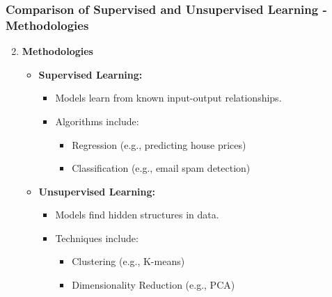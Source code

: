 \documentclass[aspectratio=169]{beamer}
\begin{document}
\begin{frame}[fragile]
    \frametitle{Comparison of Supervised and Unsupervised Learning - Methodologies}
    \begin{enumerate}
        \setcounter{enumi}{1}
        \item \textbf{Methodologies}
        \begin{itemize}
            \item \textbf{Supervised Learning:}
            \begin{itemize}
                \item Models learn from known input-output relationships.
                \item Algorithms include:
                \begin{itemize}
                    \item Regression (e.g., predicting house prices)
                    \item Classification (e.g., email spam detection)
                \end{itemize}
            \end{itemize}
            \item \textbf{Unsupervised Learning:}
            \begin{itemize}
                \item Models find hidden structures in data.
                \item Techniques include:
                \begin{itemize}
                    \item Clustering (e.g., K-means)
                    \item Dimensionality Reduction (e.g., PCA)
                \end{itemize}
            \end{itemize}
        \end{itemize}
    \end{enumerate}
\end{frame}
\end{document}
